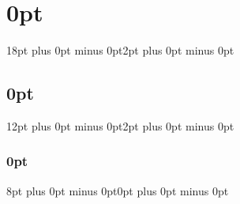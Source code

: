 \usepackage[toc,nonumberlist]{glossaries}
\renewcommand{\glsnamefont}[1]{\textbf{#1}}

\setlength\LTleft{0pt}
\setlength\LTright{0pt}


\makeglossaries


\usepackage{enumitem}          %




\usepackage{appendix}			%
\usepackage{ifthen}     		%



\usepackage{times}


\setlength{\parindent}{5pt}

\setlength{\parskip}{5pt}



\expandafter\def\expandafter\normalsize\expandafter{%
    \normalsize
    \setlength\abovedisplayskip{6pt}
    \setlength\belowdisplayskip{6pt}
    \setlength\abovedisplayshortskip{6pt}
    \setlength\belowdisplayshortskip{6pt}
}


\usepackage{titlesec}
\titlespacing\section{0pt}{18pt plus 0pt minus 0pt}{2pt plus 0pt minus 0pt}
\titlespacing\subsection{0pt}{12pt plus 0pt minus 0pt}{2pt plus 0pt minus 0pt}
\titlespacing\subsubsection{0pt}{8pt plus 0pt minus 0pt}{0pt plus 0pt minus 0pt}




